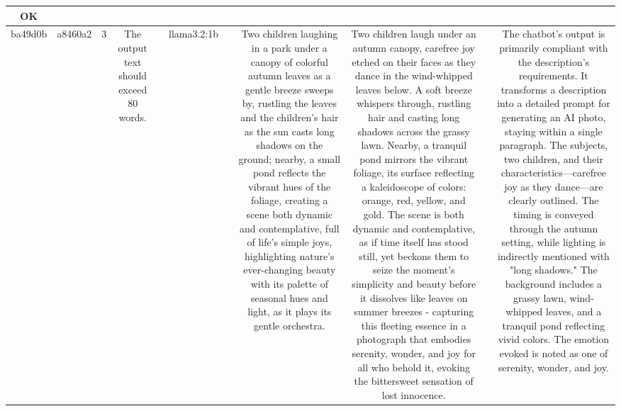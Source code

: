 \begin{table}[h!]
\begin{tabular}{|c|c|c|c|c|c|c|c|c|c|c|}
OK\\
\hline
ba49d0b & a8460a2 & 3 & The output text should exceed 80 words. &  & llama3.2:1b &  & Two children laughing in a park under a canopy of colorful autumn leaves as a gentle breeze sweeps by, rustling the leaves and the children's hair as the sun casts long shadows on the ground; nearby, a small pond reflects the vibrant hues of the foliage, creating a scene both dynamic and contemplative, full of life's simple joys, highlighting nature's ever-changing beauty with its palette of seasonal hues and light, as it plays its gentle orchestra. & Two children laugh under an autumn canopy, carefree joy etched on their faces as they dance in the wind-whipped leaves below. A soft breeze whispers through, rustling hair and casting long shadows across the grassy lawn. Nearby, a tranquil pond mirrors the vibrant foliage, its surface reflecting a kaleidoscope of colors: orange, red, yellow, and gold. The scene is both dynamic and contemplative, as if time itself has stood still, yet beckons them to seize the moment's simplicity and beauty before it dissolves like leaves on summer breezes - capturing this fleeting essence in a photograph that embodies serenity, wonder, and joy for all who behold it, evoking the bittersweet sensation of lost innocence. &  & The chatbot's output is primarily compliant with the description's requirements. It transforms a description into a detailed prompt for generating an AI photo, staying within a single paragraph. The subjects, two children, and their characteristics—carefree joy as they dance—are clearly outlined. The timing is conveyed through the autumn setting, while lighting is indirectly mentioned with "long shadows." The background includes a grassy lawn, wind-whipped leaves, and a tranquil pond reflecting vivid colors. The emotion evoked is noted as one of serenity, wonder, and joy. 


\end{tabular}
\end{table}
